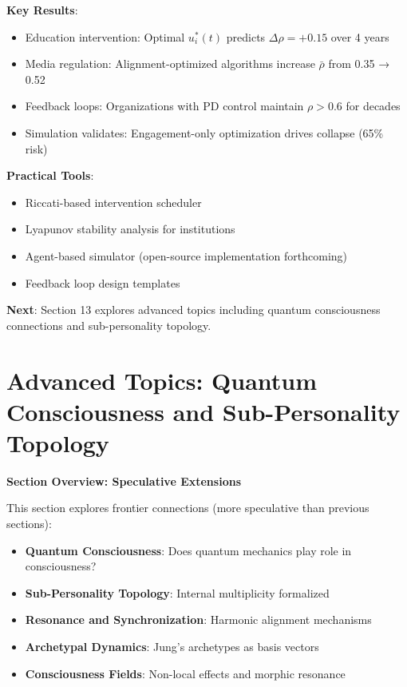 \documentclass[11pt,a4paper]{article}
\theoremstyle{definition}
\theoremstyle{remark}
\begin{document}
\begin{enumerate}
\begin{mdframed}[backgroundcolor=green!10,linewidth=2pt,linecolor=green!70!black]
\textbf{Key Results}:
\begin{itemize}[nosep]
    \item Education intervention: Optimal \(u_i^*(t)\) predicts \(\Delta\rho = +0.15\) over 4 years
    \item Media regulation: Alignment-optimized algorithms increase \(\bar{\rho}\) from 0.35 → 0.52
    \item Feedback loops: Organizations with PD control maintain \(\rho > 0.6\) for decades
    \item Simulation validates: Engagement-only optimization drives collapse (65\% risk)
\end{itemize}

\textbf{Practical Tools}:
\begin{itemize}[nosep]
    \item Riccati-based intervention scheduler
    \item Lyapunov stability analysis for institutions
    \item Agent-based simulator (open-source implementation forthcoming)
    \item Feedback loop design templates
\end{itemize}

\textbf{Next}: Section 13 explores advanced topics including quantum consciousness connections and sub-personality topology.
\end{mdframed}


\section{Advanced Topics: Quantum Consciousness and Sub-Personality Topology}

\begin{mdframed}[backgroundcolor=cyan!5,linewidth=2pt]
\textbf{Section Overview: Speculative Extensions}

This section explores frontier connections (more speculative than previous sections):

\begin{itemize}[nosep]
    \item \textbf{Quantum Consciousness}: Does quantum mechanics play role in consciousness?
    \item \textbf{Sub-Personality Topology}: Internal multiplicity formalized
    \item \textbf{Resonance and Synchronization}: Harmonic alignment mechanisms
    \item \textbf{Archetypal Dynamics}: Jung's archetypes as basis vectors
    \item \textbf{Consciousness Fields}: Non-local effects and morphic resonance
\end{itemize}


\end{mdframed}
\end{enumerate}
\end{document}
